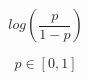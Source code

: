 \documentclass{article}
\begin{document}
$$ log \left( \frac{p}{1-p} \right) $$


$$ p \in [0,1] $$
\end{document}
